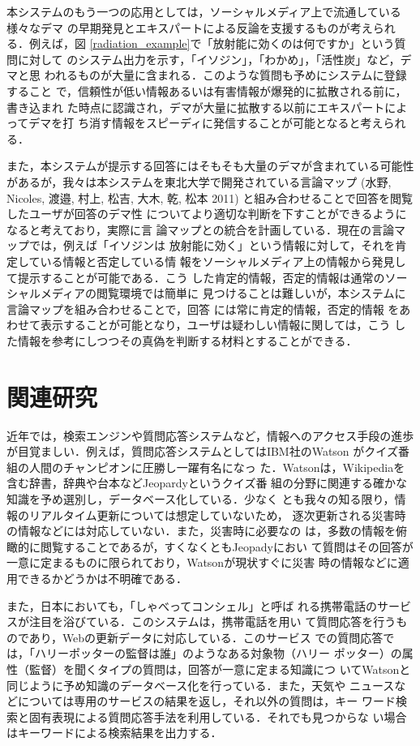 \documentclass[japanese]{jnlp_1.4}
\begin{document}
本システムのもう一つの応用としては，ソーシャルメディア上で流通している様々なデマ
の早期発見とエキスパートによる反論を支援するものが考えられる．例えば，図
\ref{radiation_example}で「放射能に効くのは何ですか」という質問に対して
のシステム出力を示す，「イソジン」，「わかめ」，「活性炭」など，デマと思
われるものが大量に含まれる．このような質問も予めにシステムに登録すること
で，信頼性が低い情報あるいは有害情報が爆発的に拡散される前に，書き込まれ
た時点に認識され，デマが大量に拡散する以前にエキスパートによってデマを打
ち消す情報をスピーディに発信することが可能となると考えられる．

また，本システムが提示する回答にはそもそも大量のデマが含まれている可能性
があるが，我々は本システムを東北大学で開発されている言論マップ
    (水野, Nicoles, 渡邉, 村上, 松吉, 大木, 乾, 松本 2011) \nocite{Mizuno2011}と組み合わせることで回答を閲覧したユーザが回答のデマ性
についてより適切な判断を下すことができるようになると考えており，実際に言
論マップとの統合を計画している．現在の言論マップでは，例えば「イソジンは
放射能に効く」という情報に対して，それを肯定している情報と否定している情
報をソーシャルメディア上の情報から発見して提示することが可能である．こう
した肯定的情報，否定的情報は通常のソーシャルメディアの閲覧環境では簡単に
見つけることは難しいが，本システムに言論マップを組み合わせることで，回答
には常に肯定的情報，否定的情報
をあわせて表示することが可能となり，ユーザは疑わしい情報に関しては，こう
した情報を参考にしつつその真偽を判断する材料とすることができる．


\section{関連研究}
\label{Related_work}

近年では，検索エンジンや質問応答システムなど，情報へのアクセス手段の進歩
が目覚ましい．例えば，質問応答システムとしてはIBM社のWatson
\cite{Ferrucci2010} がクイズ番組の人間のチャンピオンに圧勝し一躍有名になっ
た．Watsonは，Wikipediaを含む辞書，辞典や台本などJeopardyというクイズ番
組の分野に関連する確かな知識を予め選別し，データベース化している．少なく
とも我々の知る限り，情報のリアルタイム更新については想定していないため，
逐次更新される災害時の情報などには対応していない．また，災害時に必要なの
は，多数の情報を俯瞰的に閲覧することであるが，すくなくともJeopadyにおい
て質問はその回答が一意に定まるものに限られており，Watsonが現状すぐに災害
時の情報などに適用できるかどうかは不明確である．

また，日本においても，「しゃべってコンシェル」\cite{Yoshimura2012}と呼ば
れる携帯電話のサービスが注目を浴びている．このシステムは，携帯電話を用い
て質問応答を行うものであり，Webの更新データに対応している．このサービス
での質問応答では，「ハリーポッターの監督は誰」のようなある対象物（ハリー
ポッター）の属性（監督）を聞くタイプの質問は，回答が一意に定まる知識につ
いてWatsonと同じように予め知識のデータベース化を行っている．また，天気や
ニュースなどについては専用のサービスの結果を返し，それ以外の質問は，キー
ワード検索と固有表現による質問応答手法を利用している．それでも見つからな
い場合はキーワードによる検索結果を出力する．
\end{document}
